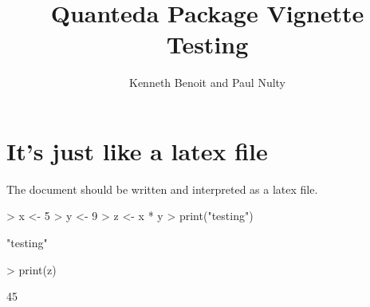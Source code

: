 \documentclass{article}
\title{Quanteda Package Vignette Testing}
\author{Kenneth Benoit and Paul Nulty}
\begin{document}


\maketitle


\section{It's just like a latex file}
The document should be written and interpreted as a latex file.

\begin{Schunk}
\begin{Sinput}
> x <- 5
> y <- 9
> z <- x * y
> print("testing")
\end{Sinput}
\begin{Soutput}
[1] "testing"
\end{Soutput}
\begin{Sinput}
> print(z)
\end{Sinput}
\begin{Soutput}
[1] 45
\end{Soutput}
\end{Schunk}
\end{document}
